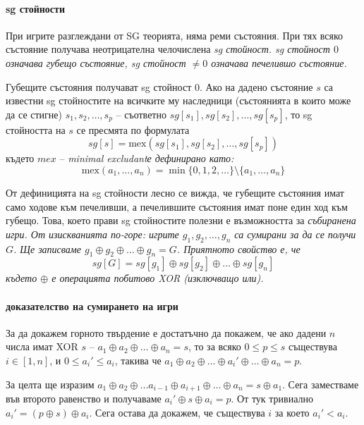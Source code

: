 \documentclass[a4paper]{article}
\begin{document}
    \paragraph{sg стойности}
    При игрите разглеждани от SG  теорията, няма реми състояния. При тях всяко
    състояние получава неотрицателна челочислена \em sg стойност\em. sg
    стойност $0$ означава губещо състояние, sg стойност $\neq 0$ означава
    печелившо състояние.

    Губещите състояния получават sg стойност $0$. Ако на дадено състояние $s$
    са известни sg стойностите на всичките му наследници (състоянията в които
    може да се стигне) $s_1, s_2, \dots, s_p$ -- съответно $sg[s_1], sg[s_2],
    \dots, sg[s_p]$, то sg стойността на $s$ се пресмята по формулата
    $$
      sg[s] = \mathrm{mex}(sg[s_1], sg[s_2], \dots, sg[s_p])
    $$
    където $mex$ -- \em{}minimal excludant\em е дефинирано като:
    $$
      \mathrm{mex}(a_1, \dots, a_n) = \min \{ 0, 1, 2, \dots \} \setminus \{ a_1, \dots, a_n \}
    $$

    От дефиницията на sg стойности лесно се вижда, че губещите състояния имат
    само ходове към печеливши, а печелившите състояния имат поне един ход към
    губещо. Това, което прави sg стойностите полезни е възможността за
    \em{}събиране\em на игри. От изискванията по-горе: игрите $g_1, g_2, \dots,
    g_n$ са сумирани за да се получи $G$. Ще записваме $g_1 \oplus g_2 \oplus
    \dots \oplus g_n = G$. Приятното свойство е, че $$sg[G] = sg[g_1] \oplus
    sg[g_2] \oplus \dots \oplus sg[g_n]$$ където $\oplus$ е операцията побитово
    XOR (изключващо или).

    \paragraph{доказателство на сумирането на игри}
    За да докажем горното твърдение е достатъчно да покажем, че ако дадени $n$
    числа имат XOR $s$ -- $a_1 \oplus a_2 \oplus \dots \oplus a_n = s$, то за
    всяко $0 \le p \le s$ съществува $i \in [1, n]$, и $0 \le a_i' \le a_i$,
    такива че $a_1 \oplus a_2 \oplus \dots \oplus a_i' \oplus \dots \oplus a_n
    = p$.

    За целта ще изразим $a_1 \oplus a_2 \oplus \dots a_{i-1} \oplus a_{i+1}
    \oplus \dots \oplus a_n = s \oplus a_1$. Сега заместваме във второто
    равенство и получаваме $a_i' \oplus s \oplus a_i = p$. От тук тривиално
    $a_i' = (p \oplus s) \oplus a_i$. Сега остава да докажем, че съществува $i$
    за което $a_i' < a_i$.
\end{document}
